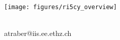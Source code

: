 \makeatletter
\begin{titlepage}

 \thispagestyle{empty}

 \begin{center}

  \begin{spacing}{2.0}
  {\Huge\textbf{\@title}}
  \end{spacing}

  \vspace{0.2cm}

  \vfill

  \texttt{[image: figures/ri5cy\_overview]}

  \vfill

  {\Large \@author}\\
  {atraber@iis.ee.ethz.ch}
  \vfill
  \@date

 \end{center}
\end{titlepage}
\makeatother
